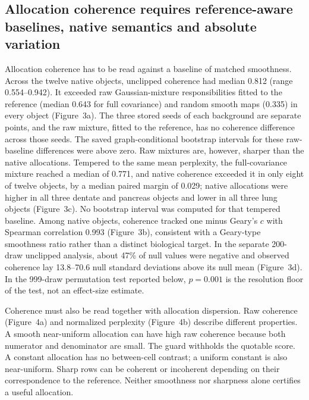 \documentclass[11pt]{article}
\begin{document}
\subsection{Allocation coherence requires reference-aware baselines, native semantics and absolute variation}

Allocation coherence has to be read against a baseline of matched smoothness. Across the twelve native objects, unclipped coherence had median 0.812 (range 0.554--0.942). It exceeded raw Gaussian-mixture responsibilities fitted to the reference (median 0.643 for full covariance) and random smooth maps (0.335) in every object (Figure~3a). The three stored seeds of each background are separate points, and the raw mixture, fitted to the reference, has no coherence difference across those seeds. The saved graph-conditional bootstrap intervals for these raw-baseline differences were above zero. Raw mixtures are, however, sharper than the native allocations. Tempered to the same mean perplexity, the full-covariance mixture reached a median of 0.771, and native coherence exceeded it in only eight of twelve objects, by a median paired margin of 0.029; native allocations were higher in all three dentate and pancreas objects and lower in all three lung objects (Figure~3c). No bootstrap interval was computed for that tempered baseline. Among native objects, coherence tracked one minus Geary's $c$ with Spearman correlation 0.993 (Figure~3b), consistent with a Geary-type smoothness ratio rather than a distinct biological target. In the separate 200-draw unclipped analysis, about 47\% of null values were negative and observed coherence lay 13.8--70.6 null standard deviations above its null mean (Figure~3d). In the 999-draw permutation test reported below, $p=0.001$ is the resolution floor of the test, not an effect-size estimate.



Coherence must also be read together with allocation dispersion. Raw coherence (Figure~4a) and normalized perplexity (Figure~4b) describe different properties. A smooth near-uniform allocation can have high raw coherence because both numerator and denominator are small. The guard withholds the quotable score. A constant allocation has no between-cell contrast; a uniform constant is also near-uniform. Sharp rows can be coherent or incoherent depending on their correspondence to the reference. Neither smoothness nor sharpness alone certifies a useful allocation.
\end{document}
